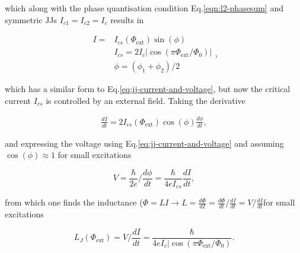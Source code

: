     \noindent  which  along  with  the  phase   quantisation  condition  Eq.\eqref{eqn:l2-phasesum}  and  symmetric  JJs
    $I_{c1}=I_{c2}=I_c$ results in

    \begin{equation}
      \begin{aligned}
        I = & I_{cs}(\Phi_\text{ext})\sin(\phi)\\
        & I_{cs} = 2I_c|\cos(\pi\Phi_\text{ext}/\Phi_0)|\\
        & \phi = (\phi_1+\phi_2)/2
      \end{aligned},
    \end{equation}

    \noindent which has a similar form to Eq.\eqref{eq:jj-current-and-voltage}, but now the critical current $I_{cs}$ is
    controlled by an external field. Taking the derivative

    \begin{equation}
      \begin{aligned}
        \frac{dI}{dt}=2I_{cs}(\Phi_\text{ext})\cos(\phi)\frac{d\phi}{dt},
      \end{aligned}
    \end{equation}

    \noindent and expressing  the voltage using Eq.\eqref{eq:jj-current-and-voltage} and  assuming $\cos(\phi)\approx1$ for
    small excitations

    \begin{equation}
      V = \frac{\hbar}{2e}/\frac{d\phi}{dt} = \frac{\hbar}{4eI_{cs}}\frac{dI}{dt},
    \end{equation}

    \noindent             from             which             one            finds             the             inductance
    ($\Phi  =  LI  \rightarrow  L  =  \frac{d\Phi}{dI}  =  \frac{d\Phi}{dt}/\frac{dI}{dt}  =  V/\frac{dI}{dt}$for  small
    excitations

    \begin{equation}
      L_J(\Phi_\text{ext}) = V/\frac{dI}{dt} = \frac{\hbar}{4eI_c|\cos(\pi\Phi_\text{ext}/\Phi_0)}.
    \end{equation}
    \vspace{6ex}

